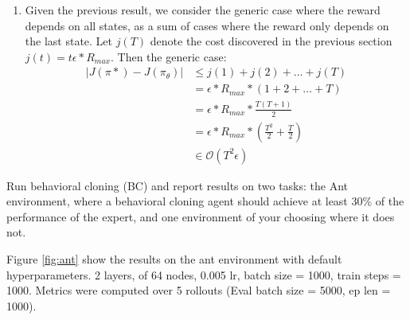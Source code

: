 \documentclass[11pt]{article}
\begin{document}
\begin{enumerate}
\begin{enumerate}
        \item Given the previous result, we consider the generic case where the reward depends on all states, as a sum of cases where the reward only depends on the last state.
        Let $j(T)$ denote the cost discovered in the previous section $j(t) = t \epsilon * R_{max}$.  Then the generic case:
        \begin{align*}
            |J(\pi*) - J(\pi_\theta)| &\leq j(1) + j(2) + \dots + j(T)\\
            &= \epsilon * R_{max} * (1 + 2 + \dots + T)\\
            &= \epsilon * R_{max} * \frac{T(T+1)}{2}\\
            &= \epsilon * R_{max} * \left(\frac{T^2}{2} + \frac{T}{2} \right)\\
            &\in \mathcal{O}(T^2 \epsilon)    
        \end{align*}
    \end{enumerate}
    
\end{enumerate}


Run behavioral cloning (BC) and report results on two tasks: the Ant environment, where
a behavioral cloning agent should achieve at least 30\% of the performance of the expert, and
one environment of your choosing where it does not.
\soln

Figure \ref{fig:ant} show the results on the ant environment with default hyperparameters.
2 layers, of 64 nodes, 0.005 lr, batch size = 1000, train steps = 1000. Metrics were computed over 5 rollouts (Eval batch size = 5000, ep len = 1000).
\end{document}
